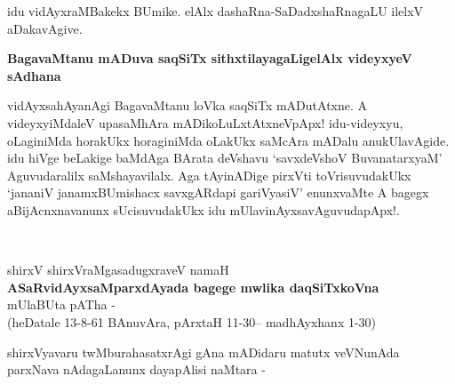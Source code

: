 idu vidAyxraMBakekx BUmike. elAlx dashaRna-SaDadxshaRnagaLU ilelxV aDakavAgive.

{\bigskip
\noindent
{\large\bf BagavaMtanu mADuva saqSiTx sithxtilayagaLigelAlx videyxyeV sAdhana}}\label{page101}
\medskip

\noindent
vidAyxsahAyanAgi BagavaMtanu loVka saqSiTx mADutAtxne. A videyxyiMdaleV upasaMhAra mADi\-koLuLx\-tAtxneVpApx! idu-videyxyu, oLaginiMda horakUkx horaginiMda oLakUkx saMcAra mADalu anu\-kUla\-vAgide. idu hiVge beLakige baMdAga BArata deVshavu `savxdeVshoV BuvanatarxyaM' Aguvudaralilx saMshaya\-vilalx. Aga tAyinADige pirxVti toVrisuvudakUkx `jananiV janamxBUmishacx savxgARdapi gariVyasiV'\label{101} enunxvaMte A bagegx aBijAcnxnavanunx sUcisuvudakUkx idu mUlavinAyxsavAguvudapApx!.

\newpage

~\phantom{a}

\bigskip

\begin{center}
shirxV shirxVraMgasadugxraveV namaH\\[.15cm]
{\Large\textbf{ASaRvidAyxsaMparxdAyada bagege mwlika daqSiTxkoVna}}\\[.15cm]
mUlaBUta pATha -\\[.15cm]
(heDatale 13-8-61 BAnuvAra, pArxtaH 11-30-- madhAyxhanx 1-30)
\end{center}

\medskip
\noindent
shirxVyavaru twMburahasatxrAgi gAna mADidaru matutx veVNunAda parxNava nAdagaLanunx dayapAlisi \-naMtara -


